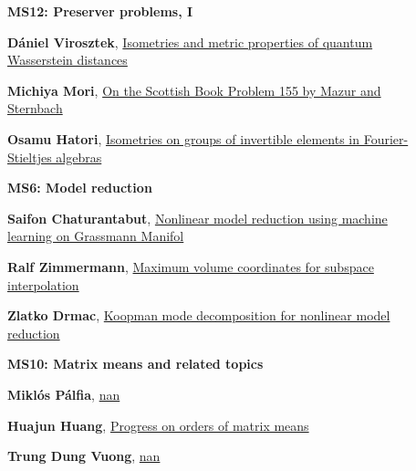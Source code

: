 \documentclass[ILAS2025-program.tex]{subfiles}
\begin{document}
\begin{description}
\begin{description}
        \end{description}
    \begin{description}
    \item[] {\color{mstitle}\textbf{MS12: Preserver problems, I}} 
    \item[] \hypertarget{up0126}{}\textbf{Dániel Virosztek}, \hyperlink{down0126}{Isometries and metric properties of quantum Wasserstein distances}
        \item[] \hypertarget{up0127}{}\textbf{Michiya Mori}, \hyperlink{down0127}{On the Scottish Book Problem 155 by Mazur and Sternbach}
        \item[] \hypertarget{up0128}{}\textbf{Osamu Hatori}, \hyperlink{down0128}{Isometries on groups of invertible elements in Fourier-Stieltjes algebras}
        \end{description}
    \begin{description}
    \item[] {\color{mstitle}\textbf{MS6: Model reduction}} 
    \item[] \hypertarget{up0129}{}\textbf{Saifon Chaturantabut}, \hyperlink{down0129}{Nonlinear model reduction using machine learning on Grassmann Manifol}
        \item[] \hypertarget{up0130}{}\textbf{Ralf Zimmermann}, \hyperlink{down0130}{Maximum volume coordinates for subspace interpolation}
        \item[] \hypertarget{up0131}{}\textbf{Zlatko Drmac}, \hyperlink{down0131}{Koopman mode decomposition for nonlinear model reduction}
        \end{description}
    \begin{description}
    \item[] {\color{mstitle}\textbf{MS10: Matrix means and related topics}} 
    \item[] \hypertarget{up0132}{}\textbf{Miklós Pálfia}, \hyperlink{down0132}{nan}
        \item[] \hypertarget{up0133}{}\textbf{Huajun Huang}, \hyperlink{down0133}{Progress on orders of matrix means}
        \item[] \hypertarget{up0134}{}\textbf{Trung Dung Vuong}, \hyperlink{down0134}{nan}
        \end{description}

\end{description}
\end{document}

